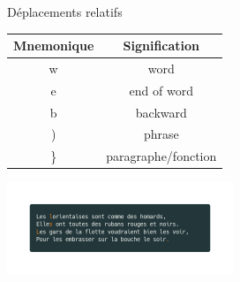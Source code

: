 \documentclass[10pt]{beamer}
\begin{document}
	\begin{frame}{Déplacements relatifs}
		\center
		\begin{tabular}{|c|c|}
			\hline
			\textbf{Mnemonique} & \textbf{Signification} \\ 
			\hline
			\hline
			w & word \\ 
			\hline
			e & end of word \\ 
			\hline
			b & backward \\ 
			\hline
			) & phrase \\ 
			\hline
			\} & paragraphe/fonction \\ 
			\hline
		\end{tabular}
		\includegraphics[width=256]{img/moves.png}
	\end{frame}
\end{document}
